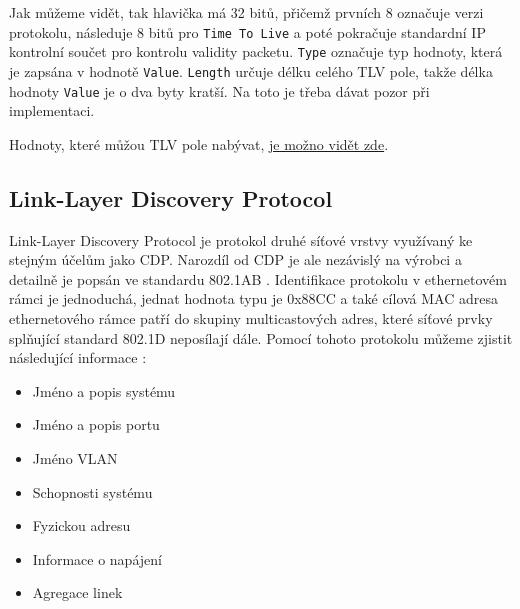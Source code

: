 \documentclass[a4paper,12pt]{article}
\begin{document}
				Jak můžeme vidět, tak hlavička má 32 bitů, přičemž prvních 8 označuje verzi protokolu, následuje 8 bitů pro \texttt{Time To Live} a poté pokračuje standardní IP kontrolní součet pro kontrolu validity packetu. \texttt{Type} označuje typ hodnoty, která je zapsána v hodnotě \texttt{Value}. \texttt{Length} určuje délku celého TLV pole, takže délka hodnoty \texttt{Value} je o dva byty kratší. Na toto je třeba dávat pozor při implementaci.
				
				\begin{table}[h]
					\begin{center}
						\caption{Struktura pole TLV}\label{cdp:tlvFormat}
						
						
						
					\end{center}
				\end{table}
				
				Hodnoty, které můžou TLV pole nabývat, \href{http://www.cs.technion.ac.il/Courses/Computer-Networks-Lab/projects/spring2003/cdp2/web\_cdp2/web\_cdp2/cdp2\_report.htm}{je možno vidět zde}.
				
				
				
		\subsection{Link-Layer Discovery Protocol}\label{lldp}
			Link-Layer Discovery Protocol je protokol druhé síťové vrstvy využívaný ke stejným účelům jako CDP. Narozdíl od CDP je ale nezávislý na výrobci a detailně je popsán ve standardu 802.1AB \cite{802.1AB}. Identifikace protokolu v ethernetovém rámci je jednoduchá, jednat hodnota typu je 0x88CC a také cílová MAC adresa ethernetového rámce patří do skupiny multicastových adres, které síťové prvky splňující standard 802.1D neposílají dále. Pomocí tohoto protokolu můžeme zjistit následující informace \cite{wiki:lldp}:
			
			\begin{itemize}
				\item Jméno a popis systému
				\item Jméno a popis portu
				\item Jméno VLAN
				\item Schopnosti systému
				\item Fyzickou adresu
				\item Informace o napájení
				\item Agregace linek
			\end{itemize}
			
\end{document}
